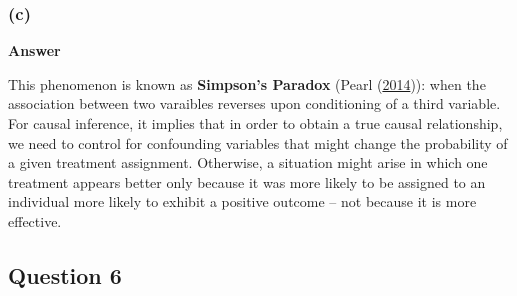 \documentclass[
  11pt,
  letterpaper,
  DIV=11,
  numbers=noendperiod]{scrartcl}
\begin{document}
\hypertarget{c-1}{%
\subsubsection{(c)}\label{c-1}}

\begin{tcolorbox}[enhanced jigsaw, breakable, leftrule=.75mm, toprule=.15mm, arc=.35mm, bottomrule=.15mm, left=2mm, opacityback=0, colback=white, colframe=quarto-callout-note-color-frame, rightrule=.15mm]

\textbf{Answer}\vspace{2mm}

This phenomenon is known as \textbf{Simpson's Paradox} (Pearl
(\protect\hyperlink{ref-Pearl2014}{2014})): when the association between
two varaibles reverses upon conditioning of a third variable. For causal
inference, it implies that in order to obtain a true causal
relationship, we need to control for confounding variables that might
change the probability of a given treatment assignment. Otherwise, a
situation might arise in which one treatment appears better only because
it was more likely to be assigned to an individual more likely to
exhibit a positive outcome -- not because it is more effective.

\end{tcolorbox}

\newpage{}

\hypertarget{question-6}{%
\subsection{Question 6}\label{question-6}}
\end{document}
